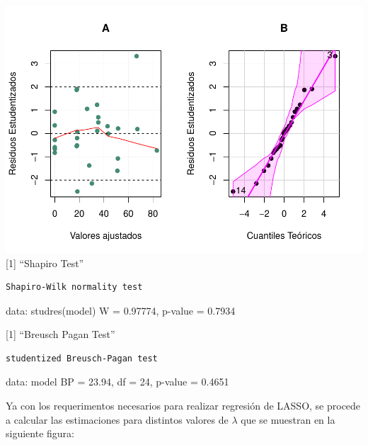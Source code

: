 \documentclass[
]{article}
\newenvironment{Shaded}{\begin{snugshade}}{\end{snugshade}}
\newcommand{\AttributeTok}[1]{\textcolor[rgb]{0.77,0.63,0.00}{#1}}
\newcommand{\DecValTok}[1]{\textcolor[rgb]{0.00,0.00,0.81}{#1}}
\newcommand{\FunctionTok}[1]{\textcolor[rgb]{0.00,0.00,0.00}{#1}}
\newcommand{\NormalTok}[1]{#1}
\newcommand{\OtherTok}[1]{\textcolor[rgb]{0.56,0.35,0.01}{#1}}
\newcommand{\SpecialCharTok}[1]{\textcolor[rgb]{0.00,0.00,0.00}{#1}}
\newcommand{\StringTok}[1]{\textcolor[rgb]{0.31,0.60,0.02}{#1}}
\begin{document}
\includegraphics{Taller-2-Regresion-Multiple-Aplicada_files/figure-latex/unnamed-chunk-5-2.pdf}
{[}1{]} ``Shapiro Test''

\begin{verbatim}
Shapiro-Wilk normality test
\end{verbatim}

data: studres(model) W = 0.97774, p-value = 0.7934

{[}1{]} ``Breusch Pagan Test''

\begin{verbatim}
studentized Breusch-Pagan test
\end{verbatim}

data: model BP = 23.94, df = 24, p-value = 0.4651

Ya con los requerimentos necesarios para realizar regresión de LASSO, se
procede a calcular las estimaciones para distintos valores de
\(\lambda\) que se muestran en la siguiente figura:

\begin{Shaded}
\end{Shaded}
\end{document}

